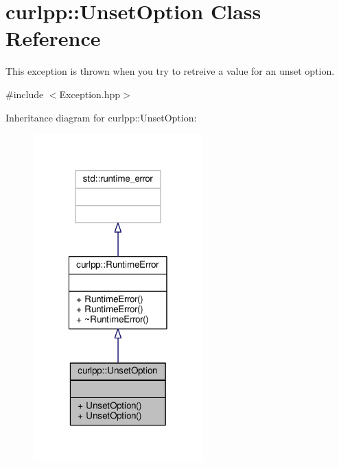 \hypertarget{classcurlpp_1_1UnsetOption}{\section{curlpp\-:\-:Unset\-Option Class Reference}
\label{classcurlpp_1_1UnsetOption}
}


This exception is thrown when you try to retreive a value for an unset option.  




{\ttfamily \#include $<$Exception.\-hpp$>$}



Inheritance diagram for curlpp\-:\-:Unset\-Option\-:
\nopagebreak
\begin{figure}[H]
\begin{center}
\leavevmode
\includegraphics[width=186pt]{classcurlpp_1_1UnsetOption__inherit__graph}
\end{center}
\end{figure}


